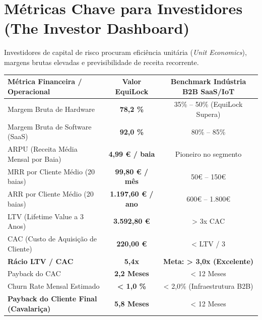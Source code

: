 \documentclass[11pt,a4paper]{article}
\begin{document}
\section{Métricas Chave para Investidores (The Investor Dashboard)}

Investidores de capital de risco procuram eficiência unitária (\emph{Unit Economics}), margens brutas elevadas e previsibilidade de receita recorrente. 

\begin{metricbox}[title=Dashboard de Unit Economics (Cavalariça Média de 20 Baias)]
\small
\begin{tabularx}{\textwidth}{X c c}
\textbf{Métrica Financeira / Operacional} & \textbf{Valor EquiLock} & \textbf{Benchmark Indústria B2B SaaS/IoT} \\
\hline
Margem Bruta de Hardware & \textbf{78,2 \%} & 35\% -- 50\% (EquiLock Supera) \\
Margem Bruta de Software (SaaS) & \textbf{92,0 \%} & 80\% -- 85\% \\
ARPU (Receita Média Mensal por Baia) & \textbf{4,99 € / baia} & Pioneiro no segmento \\
MRR por Cliente Médio (20 baias) & \textbf{99,80 € / mês} & 50€ -- 150€ \\
ARR por Cliente Médio (20 baias) & \textbf{1.197,60 € / ano} & 600€ -- 1.800€ \\
LTV (Lifetime Value a 3 Anos) & \textbf{3.592,80 €} & > 3x CAC \\
CAC (Custo de Aquisição de Cliente) & \textbf{220,00 €} & < LTV / 3 \\
\textbf{Rácio LTV / CAC} & \textbf{5,4x} & \textbf{Meta: > 3,0x (Excelente)} \\
Payback do CAC & \textbf{2,2 Meses} & < 12 Meses \\
Churn Rate Mensal Estimado & \textbf{< 1,0 \%} & < 2,0\% (Infraestrutura B2B) \\
\textbf{Payback do Cliente Final (Cavalariça)} & \textbf{5,8 Meses} & < 12 Meses \\
\hline
\end{tabularx}
\end{metricbox}

\end{document}
